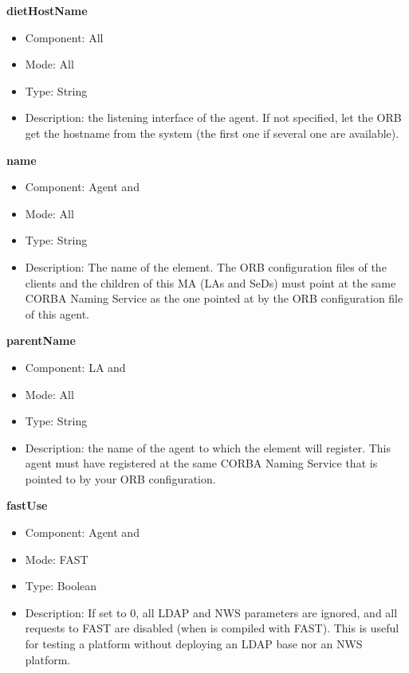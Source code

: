\begin{description}
\item{\bf{dietHostName}}
  \begin{itemize}
  \item Component: All
  \item Mode: All
  \item Type: String
  \item Description: the listening interface of the agent. If not specified,
    let the ORB get the hostname from the system (the first one if several 
    one are available).
  \end{itemize}

\item{\bf{name}}
  \begin{itemize}
  \item Component: Agent and \sed
  \item Mode: All
  \item Type: String
  \item Description: The name of the element. The ORB configuration files of the clients
    and the children of this MA (LAs and SeDs) must point at the same CORBA
    Naming Service as the one pointed at by the ORB configuration file of
    this agent.
  \end{itemize}

\item{\bf{parentName}}
  \begin{itemize}
  \item Component: LA and \sed
  \item Mode: All
  \item Type: String
  \item Description: the name of the agent to which the element will
    register. This agent must have registered at the same CORBA Naming
    Service that is  pointed to by your ORB configuration.
  \end{itemize}


\item{\bf{fastUse}}
  \begin{itemize}
  \item Component: Agent and \sed
  \item Mode: FAST
  \item Type: Boolean
  \item Description: If set to 0, all LDAP and NWS parameters are
    ignored, and all requests to FAST are disabled (when \diet is compiled
    with FAST). This is useful for testing a \diet platform without
    deploying an LDAP base nor an NWS platform.
  \end{itemize}


\end{description}

